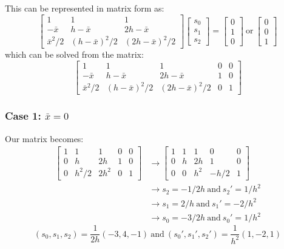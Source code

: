 \documentclass{article}
\newcommand{\andSp}{\ \mathrm{and}\ }
\begin{document}
This can be represented in matrix form as:
\begin{equation}
\begin{bmatrix}
1 & 1 & 1 \\
-\bar x & h-\bar x & 2h-\bar x \\
\bar x^2/2 & (h-\bar x)^2/2 & (2h-\bar x)^2/2
\end{bmatrix}
\begin{bmatrix}
s_0 \\ s_1 \\ s_2
\end{bmatrix}
=
\begin{bmatrix}
0 \\ 1 \\ 0
\end{bmatrix}
\ \mathrm{or}\ 
\begin{bmatrix}
0 \\ 0 \\ 1
\end{bmatrix}
\end{equation}
which can be solved from the matrix:
\begin{equation}
\begin{bmatrix}
1 & 1 & 1 & 0 & 0\\
-\bar x & h-\bar x & 2h-\bar x & 1 & 0\\
\bar x^2/2 & (h-\bar x)^2/2 & (2h-\bar x)^2/2 & 0 & 1
\end{bmatrix}
\end{equation}

\subsubsection*{Case 1: $\bar x=0$}
Our matrix becomes:
\begin{align*}
\begin{bmatrix}
1 & 1 & 1 & 0 & 0\\
0 & h & 2h & 1 & 0\\
0 & h^2/2 & 2h^2 & 0 & 1
\end{bmatrix}
&\to
\begin{bmatrix}
1 & 1 & 1 & 0 & 0\\
0 & h & 2h & 1 & 0\\
0 & 0 & h^2 & -h/2 & 1
\end{bmatrix} \\
&\to s_2=-1/2h\andSp s_2'=1/h^2 \\
&\to s_1=2/h\andSp s_1'=-2/h^2 \\
&\to s_0=-3/2h\andSp s_0'=1/h^2
\end{align*}
\begin{equation}
\boxed{(s_0,s_1,s_2)=\frac{1}{2h}(-3,4,-1)\andSp(s_0',s_1',s_2')=\frac{1}{h^2}(1,-2,1)}
\end{equation}
\end{document}

